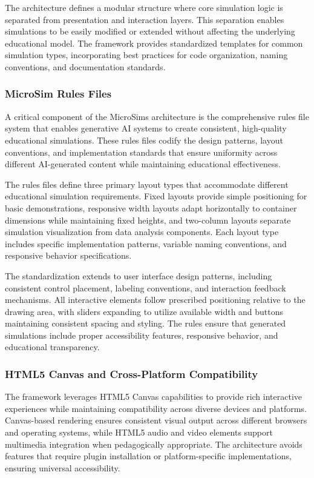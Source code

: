 The architecture defines a modular structure where core simulation logic is separated from presentation and interaction layers. This separation enables simulations to be easily modified or extended without affecting the underlying educational model. The framework provides standardized templates for common simulation types, incorporating best practices for code organization, naming conventions, and documentation standards.

\subsubsection{MicroSim Rules Files}

A critical component of the MicroSims architecture is the comprehensive rules file system that enables generative AI systems to create consistent, high-quality educational simulations. These rules files codify the design patterns, layout conventions, and implementation standards that ensure uniformity across different AI-generated content while maintaining educational effectiveness.

The rules files define three primary layout types that accommodate different educational simulation requirements. Fixed layouts provide simple positioning for basic demonstrations, responsive width layouts adapt horizontally to container dimensions while maintaining fixed heights, and two-column layouts separate simulation visualization from data analysis components. Each layout type includes specific implementation patterns, variable naming conventions, and responsive behavior specifications.

The standardization extends to user interface design patterns, including consistent control placement, labeling conventions, and interaction feedback mechanisms. All interactive elements follow prescribed positioning relative to the drawing area, with sliders expanding to utilize available width and buttons maintaining consistent spacing and styling. The rules ensure that generated simulations include proper accessibility features, responsive behavior, and educational transparency.

\subsubsection{HTML5 Canvas and Cross-Platform Compatibility}

The framework leverages HTML5 Canvas capabilities to provide rich interactive experiences while maintaining compatibility across diverse devices and platforms. Canvas-based rendering ensures consistent visual output across different browsers and operating systems, while HTML5 audio and video elements support multimedia integration when pedagogically appropriate. The architecture avoids features that require plugin installation or platform-specific implementations, ensuring universal accessibility.

